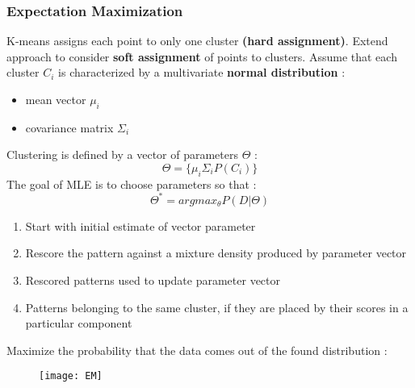 \subsubsection{Expectation Maximization}
K-means assigns each point to only one cluster \textbf{(hard assignment)}. Extend approach to consider \textbf{soft assignment} of points to clusters. Assume that each cluster $C_i$ is characterized by a multivariate \textbf{normal distribution} :
\begin{itemize}
\item mean vector $\mu_i$
\item covariance matrix $\Sigma_i$
\end{itemize}
Clustering is defined by a vector of parameters $\Theta$ :
$$ \Theta = \{ \mu_i \Sigma_i P(C_i) \}$$
The goal of MLE is to choose parameters so that :
$$ \Theta^{*} = argmax_{\theta} P(D|\Theta)$$
\begin{enumerate}
\item Start with initial estimate of vector parameter
\item Rescore the pattern against a mixture density produced by parameter vector
\item Rescored patterns used to update parameter vector
\item Patterns belonging to the same cluster, if they are placed by their scores in a particular component
\end{enumerate}
Maximize the probability that the data comes out of the found distribution :
\begin{figure}[H]
  \centering
  \texttt{[image: EM]}
\end{figure}


